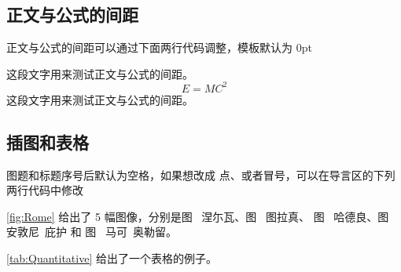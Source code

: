 \subsection{正文与公式的间距}
正文与公式的间距可以通过下面两行代码调整，模板默认为 0pt

\setlength{\abovedisplayskip}{0pt}
\setlength{\belowdisplayskip}{0pt}

这段文字用来测试正文与公式的间距。
\begin{equation}
E = MC^2
\end{equation}
这段文字用来测试正文与公式的间距。

\subsection{插图和表格}
图题和标题序号后默认为空格，如果想改成 点、或者冒号，可以在导言区的下列两行代码中修改

\begin{figure*}[htb!]
	\centering  
	\caption{罗马帝国五贤帝.}
	\label{fig:Rome}
\end{figure*}

\cref{fig:Rome} 给出了 5 幅图像，分别是图~ 涅尓瓦、图~ 图拉真、
图~ 哈德良、图~ 安敦尼\ 庇护 和 图~ 马可\ 奥勒留。


\cref{tab:Quantitative} 给出了一个表格的例子。


